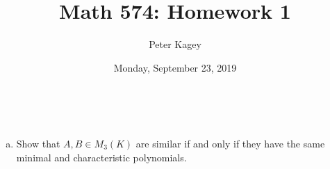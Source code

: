 \documentclass{article}
\begin{document}
\title{Math 574: Homework 1}
\author{Peter Kagey}
\date{Monday, September 23, 2019}

\maketitle

\begin{problem}{1} ~
  \begin{enumerate}[(a)]
    \item Show that $A, B \in M_3(K)$ are similar if and only if they have the
    same minimal and characteristic polynomials.
  \end{enumerate}
\end{problem}
\end{document}
